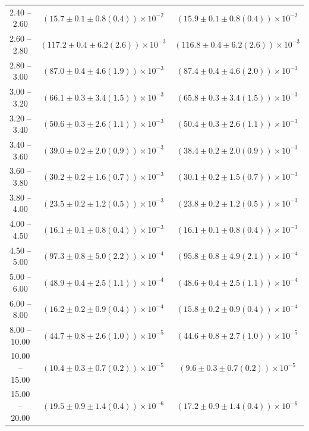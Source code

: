 \begin{table}
\begin{center}
\begin{tabular}{ c | c c }
2.40 -- 2.60 & $(15.7\pm0.1\pm0.8(0.4))\times10^{-2}$ & $(15.9\pm0.1\pm0.8(0.4))\times10^{-2}$ \\ 
2.60 -- 2.80 & $(117.2\pm0.4\pm6.2(2.6))\times10^{-3}$ & $(116.8\pm0.4\pm6.2(2.6))\times10^{-3}$ \\ 
2.80 -- 3.00 & $(87.0\pm0.4\pm4.6(1.9))\times10^{-3}$ & $(87.4\pm0.4\pm4.6(2.0))\times10^{-3}$ \\ 
3.00 -- 3.20 & $(66.1\pm0.3\pm3.4(1.5))\times10^{-3}$ & $(65.8\pm0.3\pm3.4(1.5))\times10^{-3}$ \\ 
3.20 -- 3.40 & $(50.6\pm0.3\pm2.6(1.1))\times10^{-3}$ & $(50.4\pm0.3\pm2.6(1.1))\times10^{-3}$ \\ 
3.40 -- 3.60 & $(39.0\pm0.2\pm2.0(0.9))\times10^{-3}$ & $(38.4\pm0.2\pm2.0(0.9))\times10^{-3}$ \\ 
3.60 -- 3.80 & $(30.2\pm0.2\pm1.6(0.7))\times10^{-3}$ & $(30.1\pm0.2\pm1.5(0.7))\times10^{-3}$ \\ 
3.80 -- 4.00 & $(23.5\pm0.2\pm1.2(0.5))\times10^{-3}$ & $(23.8\pm0.2\pm1.2(0.5))\times10^{-3}$ \\ 
4.00 -- 4.50 & $(16.1\pm0.1\pm0.8(0.4))\times10^{-3}$ & $(16.1\pm0.1\pm0.8(0.4))\times10^{-3}$ \\ 
4.50 -- 5.00 & $(97.3\pm0.8\pm5.0(2.2))\times10^{-4}$ & $(95.8\pm0.8\pm4.9(2.1))\times10^{-4}$ \\ 
5.00 -- 6.00 & $(48.9\pm0.4\pm2.5(1.1))\times10^{-4}$ & $(48.6\pm0.4\pm2.5(1.1))\times10^{-4}$ \\ 
6.00 -- 8.00 & $(16.2\pm0.2\pm0.9(0.4))\times10^{-4}$ & $(15.8\pm0.2\pm0.9(0.4))\times10^{-4}$ \\ 
8.00 -- 10.00 & $(44.7\pm0.8\pm2.6(1.0))\times10^{-5}$ & $(44.6\pm0.8\pm2.7(1.0))\times10^{-5}$ \\ 
10.00 -- 15.00 & $(10.4\pm0.3\pm0.7(0.2))\times10^{-5}$ & $(9.6\pm0.3\pm0.7(0.2))\times10^{-5}$ \\ 
15.00 -- 20.00 & $(19.5\pm0.9\pm1.4(0.4))\times10^{-6}$ & $(17.2\pm0.9\pm1.4(0.4))\times10^{-6}$ \\ 
\hline
\end{tabular}
\end{center}
\end{table}
 
